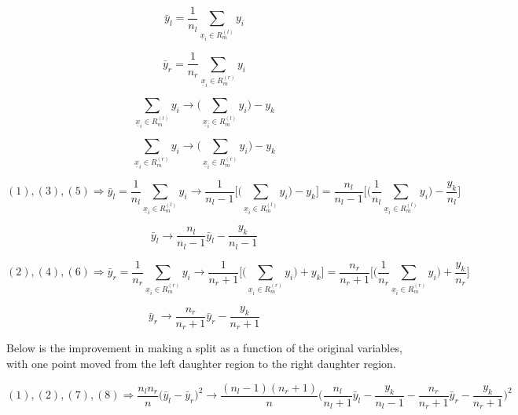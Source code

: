 \documentclass[11pt]{article}
\begin{document}
\begin{equation}
\bar{y}_l = \frac{1}{n_l}\sum_{\underline{x}_i \in R_m^{(l)}}y_i
\end{equation}

\begin{equation}
\bar{y}_r = \frac{1}{n_r}\sum_{\underline{x}_i \in R_m^{(r)}}y_i
\end{equation}

\begin{equation}
\sum_{ \underline{x}_i \in R_m^{(l)}} y_i \rightarrow \bigg( 
\sum_{ \underline{x}_i \in R_m^{(l)}}y_i \bigg) - y_k
\end{equation}

\begin{equation}
\sum_{ \underline{x}_i \in R_m^{(r)}} y_i \rightarrow \bigg( 
\sum_{ \underline{x}_i \in R_m^{(r)}}y_i \bigg) - y_k
\end{equation}

$$(1), (3), (5) \Rightarrow \bar{y}_l = \frac{1}{n_l}\sum_{\underline{x}_i 
\in R_m^{(l)}}y_i \rightarrow \frac{1}{n_l-1}\Bigg[\bigg(\sum_{\underline{x}_i 
\in R_m^{(l)}}y_i\bigg)-y_k\Bigg] = \frac{n_l}{n_l-1}
\Bigg[\bigg(\frac{1}{n_l}\sum_{\underline{x}_i \in R_m^{(l)}}y_i\bigg) - 
\frac{y_k}{n_l}\Bigg]$$

\begin{equation}
\bar{y}_l \rightarrow \frac{n_l}{n_l-1}\bar{y}_l - \frac{y_k}{n_l-1}
\end{equation}

$$(2), (4), (6) \Rightarrow \bar{y}_r = \frac{1}{n_r}\sum_{\underline{x}_i 
\in R_m^{(r)}}y_i \rightarrow \frac{1}{n_r+1}\Bigg[\bigg(\sum_{\underline{x}_i 
\in R_m^{(r)}}y_i\bigg)+y_k\Bigg] = \frac{n_r}{n_r+1}\Bigg[\bigg(\frac{1}{n_r}
\sum_{\underline{x}_i \in R_m^{(r)}}y_i\bigg) + \frac{y_k}{n_r}\Bigg]$$

\begin{equation}
\bar{y}_r \rightarrow \frac{n_r}{n_r+1}\bar{y}_r - \frac{y_k}{n_r+1}
\end{equation}

Below is the improvement in making a split as a function of the original 
variables, with one point moved from the left daughter region to the right 
daughter region. 

$$(1), (2), (7), (8) \Rightarrow \frac{n_ln_r}{n} \big(\bar{y}_l - 
\bar{y}_r\big)^2 \rightarrow \frac{(n_l-1)(n_r+1)}{n}
\bigg(\frac{n_l}{n_l+1}\bar{y}_l - \frac{y_k}{n_l-1} - 
\frac{n_r}{n_r+1}\bar{y}_r - \frac{y_k}{n_r + 1}\bigg)^2$$
\end{document}

